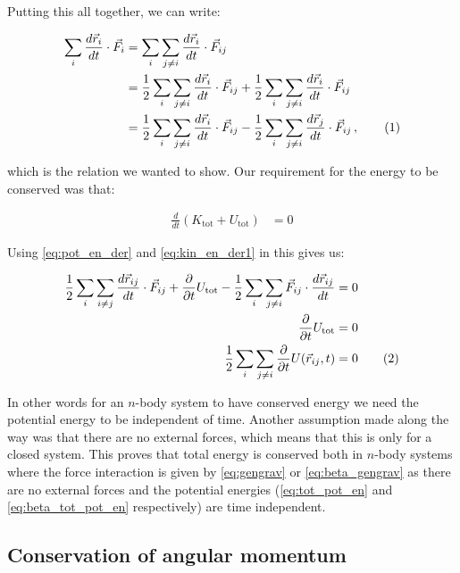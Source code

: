 \documentclass[reprint,english,notitlepage]{revtex4-1}  %
\newcommand\numberthis{\addtocounter{equation}{1}\tag{\theequation}}
\begin{document}
Putting this all together, we can write:

\begin{align*}
\sum\limits_i \frac{d\vec{r}_i}{dt} \cdot \vec{F}_i &= \sum\limits_i \sum\limits_{j \neq i} \frac{d\vec{r}_i}{dt} \cdot \vec{F}_{ij} \\
&= \frac{1}{2} \sum\limits_i \sum\limits_{j \neq i} \frac{d\vec{r}_i}{dt} \cdot \vec{F}_{ij} + \frac{1}{2} \sum\limits_i \sum\limits_{j \neq i} \frac{d\vec{r}_i}{dt} \cdot \vec{F}_{ij} \\
&= \frac{1}{2} \sum\limits_i \sum\limits_{j \neq i} \frac{d\vec{r}_i}{dt} \cdot \vec{F}_{ij} - \frac{1}{2} \sum\limits_i \sum\limits_{j \neq i} \frac{d\vec{r}_j}{dt} \cdot \vec{F}_{ij} \, , \numberthis \label{eq:pos_force_dot_sum}
\end{align*}

which is the relation we wanted to show. Our requirement for the energy to be conserved was that:

\begin{align*}
\frac{d}{dt}(K_\text{tot} + U_\text{tot}) &= 0
\end{align*}

Using \eqref{eq:pot_en_der} and \eqref{eq:kin_en_der1} in this gives us:

\begin{align*}
\frac{1}{2}\sum\limits_i \sum\limits_{i\neq j} \frac{d\vec{r}_{ij}}{dt} \cdot \vec{F}_{ij} + \frac{\partial}{\partial t} U_\text{tot} - \frac{1}{2}\sum\limits_{i} \sum\limits_{j\neq i} \vec{F}_{ij} \cdot \frac{d\vec{r}_{ij}}{dt} &= 0 \\
\frac{\partial}{\partial t} U_\text{tot} &= 0 \\
\frac{1}{2}\sum\limits_i \sum\limits_{j\neq i } \frac{\partial}{\partial t} U(\vec{r}_{ij},t) &= 0 \numberthis \label{eq:energy_cons}
\end{align*}

In other words for an $n$-body system to have conserved energy we need the potential energy to be independent of time. Another assumption made along the way was that there are no external forces, which means that this is only for a closed system. This proves that total energy is conserved both in $n$-body systems where the force interaction is given by \eqref{eq:gengrav} or \eqref{eq:beta_gengrav} as there are no external forces and the potential energies (\eqref{eq:tot_pot_en} and \eqref{eq:beta_tot_pot_en} respectively) are time independent.


\subsection{Conservation of angular momentum} \label{sec:II:d}
\end{document}
